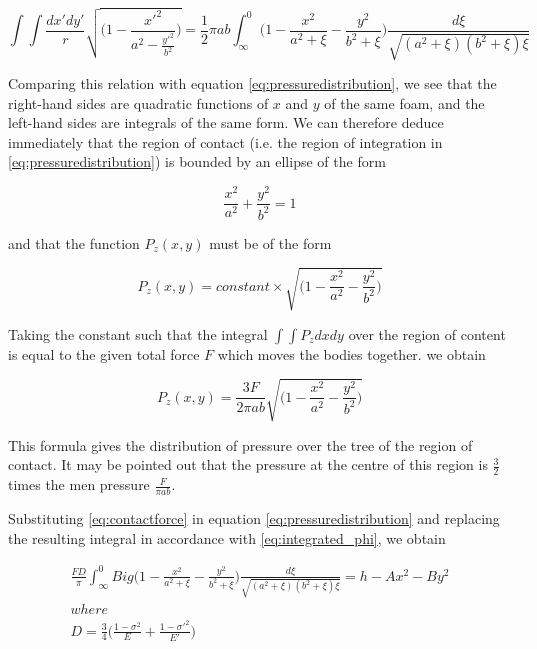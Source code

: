 \begin{equation}
\int\int\frac{dx'dy'}{r}\sqrt{\Big( 1- \frac{x'^{2}}{a^{2} - \frac{y'^{2}}{b^{2}}} \Big)} = \frac{1}{2}\pi ab\int_{\infty}^{0} \Big( 1-\frac{x^{2}}{a^{2}+\xi} - \frac{y^{2}}{b^{2}+\xi} \Big) \frac{d\xi}{\sqrt{(a^{2}+\xi)(b^{2}+\xi)\xi}}
\label{eq:integrated_phi}
\end{equation}

Comparing this relation with equation \ref{eq:pressuredistribution}, we see that the right-hand sides are quadratic functions of $x$ and $y$ of the same foam, and the left-hand sides are integrals of the same form. We can therefore deduce immediately that the region of contact (i.e. the region of integration in \ref{eq:pressuredistribution}) is bounded
by an ellipse of the form

\begin{equation}
\frac{x^{2}}{a^{2}} + \frac{y^{2}}{b^{2}} = 1
\label{eq:ellipse}
\end{equation}




and that the function $P_{z}(x,y)$ must be of the form

\begin{equation}
P_{z}(x,y) = constant \times \sqrt{\Big( 1 - \frac{x^{2}}{a^{2}} - \frac{y^{2}}{b^{2}} \Big)}
\end{equation}


Taking the constant such that the integral $\int\int P_{z}dxdy$ over the region of
content is equal to the given total force $F$ which moves the bodies together.
we obtain

\begin{equation}
P_{z}(x,y) = \frac{3F}{2\pi ab} \sqrt{\Big( 1 - \frac{x^{2}}{a^{2}} - \frac{y^{2}}{b^{2}} \Big)}
\label{eq:contactforce}
\end{equation}

This formula gives the distribution of pressure over the tree of the region of
contact. It may be pointed out that the pressure at the centre of this region
is $\frac{3}{2}$ times the men pressure $\frac{F}{\pi ab}$.

Substituting \ref{eq:contactforce} in equation \ref{eq:pressuredistribution} and replacing the resulting integral
in accordance with \ref{eq:integrated_phi}, we obtain

\begin{equation}
\begin{split}
\frac{FD}{\pi} \int_{\infty}^{0} Big( 1 - \frac{x^{2}}{a^{2} + \xi} - \frac{y^{2}}{b^{2} + \xi} \Big) \frac{d\xi}{\sqrt{(a^{2} + \xi)(b^{2} + \xi)\xi}} = h - Ax^{2} - By^{2} \\
where \\
D = \frac{3}{4} \Big( \frac{1-\sigma^{2}}{E} + \frac{1-\sigma'^{2}}{E'} \Big)
\end{split}
\end{equation}


